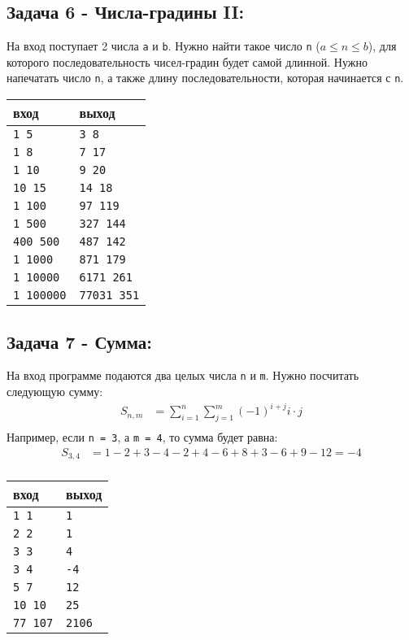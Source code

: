 \documentclass{article}
\begin{document}
\subsection*{Задача 6 - Числа-градины II:}
На вход поступает 2 числа \texttt{a} и \texttt{b}. Нужно найти такое число \texttt{n} ($a \le n \le b$), для которого последовательность чисел-градин будет самой длинной. Нужно напечатать число \texttt{n}, а также длину последовательности, которая начинается с \texttt{n}.
\begin{center}
\begin{tabular}{ l l }
 вход & выход \\ \hline
 \texttt{1 5}  & \texttt{3 8}  \\ 
 \texttt{1 8} & \texttt{7 17}  \\ 
 \texttt{1 10} & \texttt{9 20}  \\ 
 \texttt{10 15} & \texttt{14 18}  \\ 
 \texttt{1 100} & \texttt{97 119}  \\ 
 \texttt{1 500} & \texttt{327 144}  \\ 
 \texttt{400 500} & \texttt{487 142}  \\ 
 \texttt{1 1000} & \texttt{871 179}  \\ 
 \texttt{1 10000} & \texttt{6171 261}  \\ 
 \texttt{1 100000} & \texttt{77031 351}  \\ 
\end{tabular}
\end{center}

\subsection*{Задача 7 - Сумма:}
На вход программе подаются два целых числа \texttt{n} и \texttt{m}. Нужно посчитать следующую сумму:
\begin{align*}
  S_{n,m} &= \sum_{i=1}^{n} \sum_{j=1}^{m} (-1)^{i + j} i \cdot j \\
\end{align*}
Например, если \texttt{n = 3}, а \texttt{m = 4}, то сумма будет равна:
\begin{align*}
  S_{3,4} &= 1 - 2 + 3 - 4 - 2 + 4 - 6 + 8 + 3 - 6 + 9 - 12 = -4\\
\end{align*}

\begin{center}
\begin{tabular}{ l l }
 вход & выход \\ \hline
 \texttt{1 1}  & \texttt{1}  \\ 
 \texttt{2 2} & \texttt{1}  \\ 
 \texttt{3 3} & \texttt{4}  \\ 
 \texttt{3 4} & \texttt{-4}  \\  
 \texttt{5 7} & \texttt{12}  \\  
 \texttt{10 10} & \texttt{25}  \\  
 \texttt{77 107} & \texttt{2106}  \\ 
\end{tabular}
\end{center}
\end{document}
